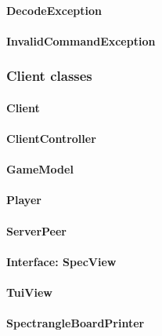 \documentclass[12pt, letterpaper]{article}
\begin{document}
    \paragraph{DecodeException}

    \paragraph{InvalidCommandException}



    \subsubsection{Client classes}

    \paragraph{Client}

    \paragraph{ClientController}

    \paragraph{GameModel}

    \paragraph{Player}

    \paragraph{ServerPeer}

    \paragraph{Interface: SpecView}

    \paragraph{TuiView}

    \paragraph{SpectrangleBoardPrinter}
\end{document}
